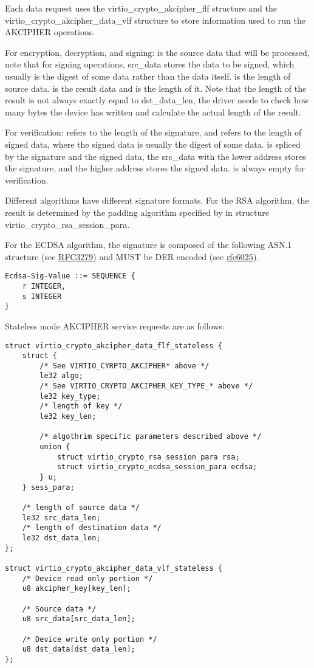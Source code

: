 Each data request uses the virtio_crypto_akcipher_flf structure and the virtio_crypto_akcipher_data_vlf
structure to store information used to run the AKCIPHER operations.

For encryption, decryption, and signing:
 is the source data that will be processed, note that for signing operations,
src_data stores the data to be signed, which usually is the digest of some data rather than the
data itself.
 is the length of source data.
 is the result data and  is the length of it. Note that the
length of the result is not always exactly equal to dst_data_len, the driver needs to check how
many bytes the device has written and calculate the actual length of the result.

For verification:
 refers to the length of the signature, and  refers to
the length of signed data, where the signed data is usually the digest of some data.
 is spliced by the signature and the signed data, the src_data with the lower
address stores the signature, and the higher address stores the signed data.
 is always empty for verification.

Different algorithms have different signature formats.
For the RSA algorithm, the result is determined by the padding algorithm specified by
 in structure virtio_crypto_rsa_session_para.

For the ECDSA algorithm, the signature is composed of the following
ASN.1 structure (see \hyperref[intro:rfc3279]{RFC3279})
and MUST be DER encoded (see \hyperref[intro:rfc6025]{rfc6025}).

\begin{lstlisting}
Ecdsa-Sig-Value ::= SEQUENCE {
    r INTEGER,
    s INTEGER
}
\end{lstlisting}

Stateless mode AKCIPHER service requests are as follows:
\begin{lstlisting}
struct virtio_crypto_akcipher_data_flf_stateless {
    struct {
        /* See VIRTIO_CYRPTO_AKCIPHER* above */
        le32 algo;
        /* See VIRTIO_CRYPTO_AKCIPHER_KEY_TYPE_* above */
        le32 key_type;
        /* length of key */
        le32 key_len;

        /* algothrim specific parameters described above */
        union {
            struct virtio_crypto_rsa_session_para rsa;
            struct virtio_crypto_ecdsa_session_para ecdsa;
        } u;
    } sess_para;

    /* length of source data */
    le32 src_data_len;
    /* length of destination data */
    le32 dst_data_len;
};

struct virtio_crypto_akcipher_data_vlf_stateless {
    /* Device read only portion */
    u8 akcipher_key[key_len];

    /* Source data */
    u8 src_data[src_data_len];

    /* Device write only portion */
    u8 dst_data[dst_data_len];
};
\end{lstlisting}

